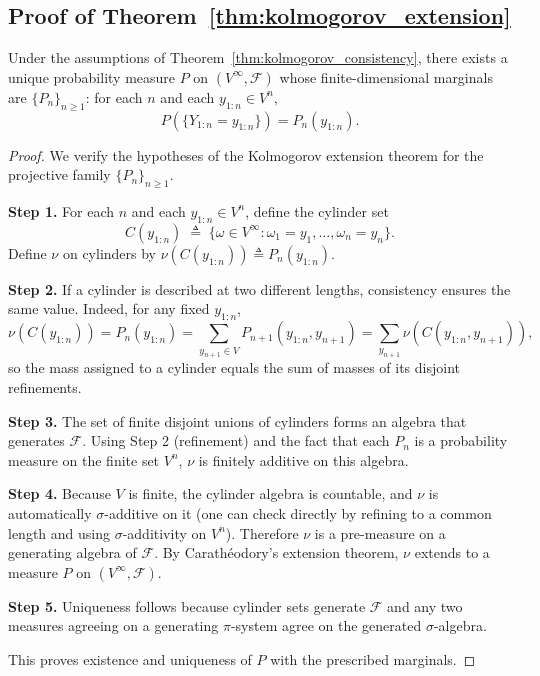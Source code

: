 \documentclass[11pt]{article}
\begin{document}

\subsection{Proof of Theorem~\ref{thm:kolmogorov_extension}}
\label{app:proof_kolmogorov_extension}

\begin{theorem}
Under the assumptions of Theorem~\ref{thm:kolmogorov_consistency}, there exists a unique probability
measure $P$ on $(V^\infty,\mathcal F)$ whose finite-dimensional marginals are $\{P_n\}_{n\ge 1}$:
for each $n$ and each $y_{1:n}\in V^n$,
\[
P(\{Y_{1:n}=y_{1:n}\}) = P_n(y_{1:n}).
\]
\end{theorem}

\begin{proof}
We verify the hypotheses of the Kolmogorov extension theorem for the projective family $\{P_n\}_{n\ge 1}$.

\textbf{Step 1.}
For each $n$ and each $y_{1:n}\in V^n$, define the cylinder set
\[
C(y_{1:n}) \;\triangleq\; \{ \omega\in V^\infty : \omega_1=y_1,\dots,\omega_n=y_n\}.
\]
Define $\nu$ on cylinders by $\nu(C(y_{1:n})) \triangleq P_n(y_{1:n})$.

\textbf{Step 2.}
If a cylinder is described at two different lengths, consistency ensures the same value.
Indeed, for any fixed $y_{1:n}$,
\[
\nu(C(y_{1:n}))
=
P_n(y_{1:n})
=
\sum_{y_{n+1}\in V} P_{n+1}(y_{1:n},y_{n+1})
=
\sum_{y_{n+1}} \nu(C(y_{1:n},y_{n+1})),
\]
so the mass assigned to a cylinder equals the sum of masses of its disjoint refinements.

\textbf{Step 3.}
The set of finite disjoint unions of cylinders forms an algebra that generates $\mathcal F$.
Using Step 2 (refinement) and the fact that each $P_n$ is a probability measure on the finite set $V^n$,
$\nu$ is finitely additive on this algebra.

\textbf{Step 4.}
Because $V$ is finite, the cylinder algebra is countable, and $\nu$ is automatically $\sigma$-additive
on it (one can check directly by refining to a common length and using $\sigma$-additivity on $V^n$).
Therefore $\nu$ is a pre-measure on a generating algebra of $\mathcal F$.
By Carath\'eodory's extension theorem, $\nu$ extends to a measure $P$ on $(V^\infty,\mathcal F)$.

\textbf{Step 5.}
Uniqueness follows because cylinder sets generate $\mathcal F$ and any two measures agreeing on a generating
$\pi$-system agree on the generated $\sigma$-algebra.

This proves existence and uniqueness of $P$ with the prescribed marginals.
\end{proof}
\end{document}
